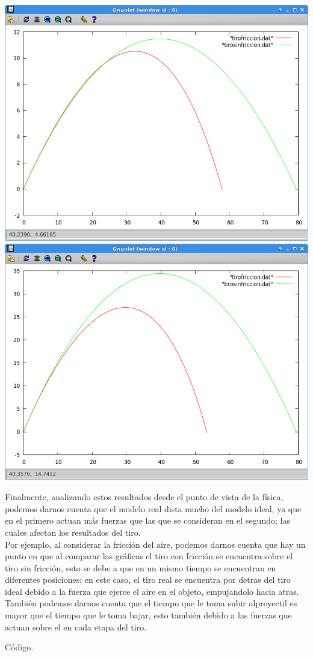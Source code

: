\documentclass[12pt]{article}
\begin{document}
\begin{center}
\includegraphics[scale=0.8]{producto630.png}
\includegraphics[scale=0.8]{producto660.png}
\end{center}
Finalmente, analizando estos resultados desde el punto de vista de la física, podemos darnos cuenta que el modelo real dista mucho del modelo ideal, ya que en el primero actuan más fuerzas que las que se consideran en el segundo; las cuales afectan los resultados del tiro.\\
Por ejemplo, al considerar la fricción del aire, podemos darnos cuenta que hay un punto en que al comparar las gráficas el tiro con fricción se encuentra sobre el tiro sin fricción, esto se debe a que en un mismo tiempo se encuentran en diferentes posiciones; en este caso, el tiro real se encuentra por detras del tiro ideal debido a la fuerza que ejerce el aire en el objeto, empujandolo hacia atras.\\
También podemos darnos cuenta que el tiempo que le toma subir alproyectil es mayor que el tiempo que le toma bajar, esto también debido a las fuerzas que actuan sobre el en cada etapa del tiro.
\newpage
\begin{LARGE}
Código.
\end{LARGE} 
\\
\end{document}
